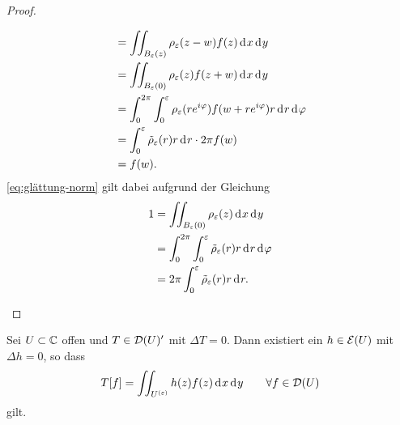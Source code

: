 \begin{proof}
\begin{enumerate}
\begin{align}
      & = \iint_{B_\epsilon(z)} \rho_\epsilon(z -w ) f(z) \d[x]\d[y]
      \nonumber \\
      & = \iint_{B_\epsilon(0)} \rho_\epsilon(z) f(z + w) \d[x]\d[y]
      \nonumber \\
      & = \int_0^{2\pi} \int_0^\epsilon \rho_\epsilon(re^{i\phi}) f(w +
       re^{i\phi}) r \d[r] \d[\phi] \nonumber \\
      & = \int_0^\epsilon \tilde \rho_\epsilon(r) r\d[r] \cdot 2 \pi
      f(w) \nonumber \\
      & = f(w). \label{eq:glättung-norm} 
    \end{align}
    \eqref{eq:glättung-norm} gilt dabei aufgrund der Gleichung
    \begin{align*}
      1 & = \iint_{B_\epsilon(0)}\rho_\epsilon(z) \d[x]\d[y] \\
      & = \int_0^{2\pi}\int_0^{\epsilon} \tilde \rho_\epsilon(r) r
      \d[r] \d[\phi] \\
      & = 2 \pi \int_0^\epsilon \tilde \rho_\epsilon(r) r \d[r].
    \end{align*}
  \end{enumerate}
\end{proof}

\begin{thm}
  \label{thm:weyl}
  Sei $U \subset \mathbb{C}$ offen und $T \in \mathcal{D}(U)'$ mit $\Delta T =
  0$. 
  Dann existiert ein $h \in \mathcal{E}(U)$ mit $\Delta h = 0$, so dass
  \[T[f] = \iint_{U^{(\epsilon)}} h(z) f(z) \d[x]\d[y] \qquad \forall f \in \dist(U)
  \]
  gilt.
\end{thm}

